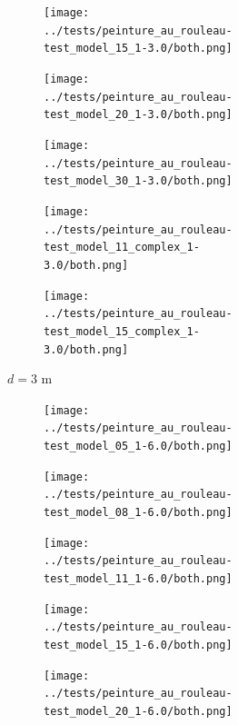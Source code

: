 \documentclass[english,RandD]{rapportPFE}  %
\begin{document}
\begin{figure}[H]
\begin{subfigure}[t]{\linewidth}
				\hfill
				\begin{subfigure}[t]{0.11\linewidth}
					\texttt{[image: ../tests/peinture\_au\_rouleau-test\_model\_15\_1-3.0/both.png]}
				\end{subfigure}
				\hfill
				\begin{subfigure}[t]{0.11\linewidth}
					\texttt{[image: ../tests/peinture\_au\_rouleau-test\_model\_20\_1-3.0/both.png]}
				\end{subfigure}
				\hfill
				\begin{subfigure}[t]{0.11\linewidth}
					\texttt{[image: ../tests/peinture\_au\_rouleau-test\_model\_30\_1-3.0/both.png]}
				\end{subfigure}
				\hfill
				\begin{subfigure}[t]{0.11\linewidth}
					\texttt{[image: ../tests/peinture\_au\_rouleau-test\_model\_11\_complex\_1-3.0/both.png]}
				\end{subfigure}
				\hfill
				\begin{subfigure}[t]{0.11\linewidth}
					\texttt{[image: ../tests/peinture\_au\_rouleau-test\_model\_15\_complex\_1-3.0/both.png]}
				\end{subfigure}
				\caption{$d = 3$ m}
			\end{subfigure}
			\hfill
			\begin{subfigure}[t]{\linewidth}
				\centering
				\begin{subfigure}[t]{0.11\linewidth}
					\texttt{[image: ../tests/peinture\_au\_rouleau-test\_model\_05\_1-6.0/both.png]}
				\end{subfigure}
				\hfill
				\begin{subfigure}[t]{0.11\linewidth}
					\texttt{[image: ../tests/peinture\_au\_rouleau-test\_model\_08\_1-6.0/both.png]}
				\end{subfigure}
				\hfill
				\begin{subfigure}[t]{0.11\linewidth}
					\texttt{[image: ../tests/peinture\_au\_rouleau-test\_model\_11\_1-6.0/both.png]}
				\end{subfigure}
				\hfill
				\begin{subfigure}[t]{0.11\linewidth}
					\texttt{[image: ../tests/peinture\_au\_rouleau-test\_model\_15\_1-6.0/both.png]}
				\end{subfigure}
				\hfill
				\begin{subfigure}[t]{0.11\linewidth}
					\texttt{[image: ../tests/peinture\_au\_rouleau-test\_model\_20\_1-6.0/both.png]}
				\end{subfigure}
				\hfill
				\begin{subfigure}[t]{0.11\linewidth}

\end{subfigure}
\end{subfigure}
\end{figure}
\end{document}
